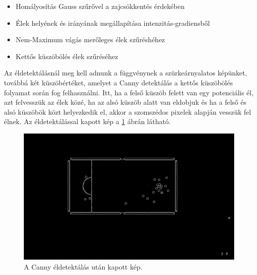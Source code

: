 \begin{itemize}
    \setlength\itemsep{-2pt}
    \item Homályosítás Gauss szűrővel \cite{shapiro2001} a zajcsökkentés érdekében
    \item Élek helyének és irányának megállapítása intenzitás-gradiensből
    \item Nem-Maximum vágás merőleges élek szűréshéhez
    \item Kettős küszöbölés élek szűréséhez
\end{itemize}

\par Az éldetektálásnál meg kell adnunk a függvénynek a szürkeárnyalatos képünket, továbbá két küszöbértéket, amelyet a Canny detektálás a kettős küszöbölés folyamat során fog felhasználni. Itt, ha a felső küszöb felett van egy potenciális él, azt felvesszük az élek közé, ha az alsó küszöb alatt van eldobjuk és ha a felső és alsó küszöbök közt helyezkedik el, akkor a szomszédos pixelek alapján vesszük fel élnek. Az éldetektálással kapott kép a \ref{fig:bemeneti_kep_edge} ábrán látható.

\begin{figure}[!ht]
    \centering
    \includegraphics[width=150mm, keepaspectratio]{figures/input_screen_edge.png}
    \caption{A Canny éldetektálás után kapott kép.}
    \label{fig:bemeneti_kep_edge}
\end{figure}